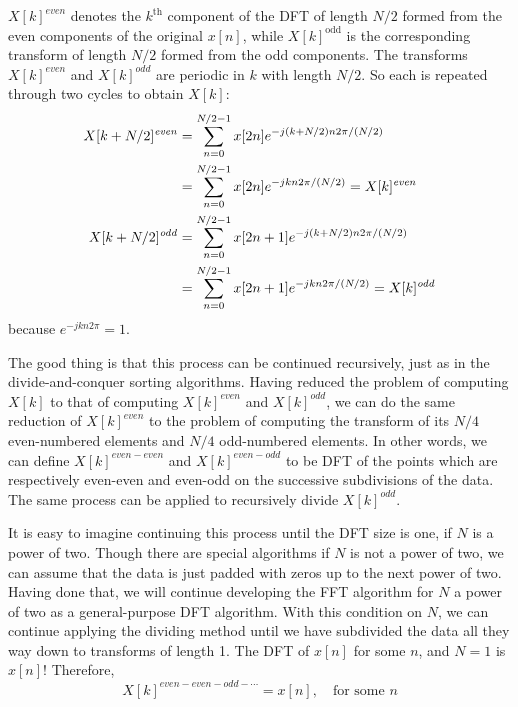 $X[k]^{\mathit{even}}$ denotes the $k^{\textrm{th}}$ component of the
DFT of length $N/2$ formed from the even components of the original
$x[n]$, while $X[k]^{\mathrm{odd}}$ is the corresponding transform of
length $N/2$ formed from the odd components. The transforms
$X[k]^{\mathit{even}}$ and $X[k]^{\mathit{odd}}$ are periodic in $k$
with length $N/2$. So each is repeated through two cycles to obtain
$X[k]$:
\begin{align}
X[k+N/2]^{\mathit{even}} &= \sum_{n=0}^{N/2-1} x[2n] e^{-j(k+N/2)n2\pi/(N/2)}
\notag\\
&= \sum_{n=0}^{N/2-1} x[2n] e^{-jkn2\pi/(N/2)}=X[k]^{\mathit{even}} 
\label{eq:fft-repeat-even}
\\
X[k+N/2]^{\mathit{odd}} &= \sum_{n=0}^{N/2-1} x[2n+1] e^{-j(k+N/2)n2\pi/(N/2)}
\notag\\
&= \sum_{n=0}^{N/2-1} x[2n+1] e^{-jkn2\pi/(N/2)}=X[k]^{\mathit{odd}}
\label{eq:fft-repeat-odd}
\end{align}
because $e^{-jkn2\pi}=1$. 

The good thing is that this process can be continued recursively, just
as in the divide-and-conquer sorting algorithms. Having reduced the
problem of computing $X[k]$ to that of computing
$X[k]^{\mathit{even}}$ and $X[k]^{\mathit{odd}}$, we can do the same
reduction of $X[k]^{\mathit{even}}$ to the problem of computing the
transform of its $N/4$ even-numbered elements and $N/4$ odd-numbered
elements. In other words, we can define $X[k]^{\mathit{even-even}}$
and $X[k]^{\mathit{even-odd}}$ to be DFT of the points which are
respectively even-even and even-odd on the successive subdivisions of
the data. The same process can be applied to recursively divide
$X[k]^{\mathit{odd}}$.

It is easy to imagine continuing this process until the DFT size is
one, if $N$ is a power of two. Though there are special algorithms if
$N$ is not a power of two, we can assume that the data is just padded
with zeros up to the next power of two. Having done that, we will
continue developing the FFT algorithm for $N$ a power of two as a
general-purpose DFT algorithm. With this condition on $N$, we can
continue applying the dividing method until we have subdivided the
data all they way down to transforms of length 1. The DFT of $x[n]$ for
some $n$, and $N=1$ is $x[n]$! Therefore,
\begin{equation}
X[k]^\mathit{even-even-odd-\cdots} = x[n], \quad \text{for some } n
\end{equation}

